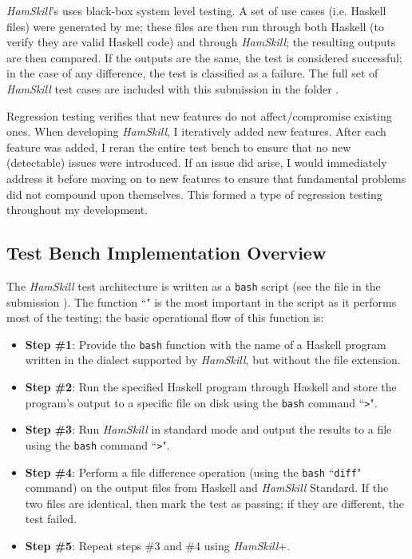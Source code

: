 \documentclass{report}
\begin{document}
\textit{HamSkill}'s uses black-box system level testing.  A set of use cases (i.e. Haskell files) were generated by me; these files are then run through both Haskell (to verify they are valid Haskell code) and through \textit{HamSkill}; the resulting outputs are then compared.  If the outputs are the same, the test is considered successful; in the case of any difference, the test is classified as a failure.  The full set of \textit{HamSkill} test cases are included with this submission in the folder .

Regression testing verifies that new features do not affect/compromise existing ones.  When developing \textit{HamSkill}, I iteratively added new features.  After each feature was added, I reran the entire test bench to ensure that no new (detectable) issues were introduced.  If an issue did arise, I would immediately address it before moving on to new features to ensure that fundamental problems did not compound upon themselves. This formed a type of regression testing throughout my development.

\subsection{Test Bench Implementation Overview}

The \textit{HamSkill} test architecture is written as a \texttt{bash} script (see the file in the submission ).  The function ``" is the most important in the script as it performs most of the testing; the basic operational flow of this function is:

\begin{itemize}

\item \textbf{Step \#1}: Provide the \texttt{bash} function with the name of a Haskell program written in the dialect supported by \textit{HamSkill}, but without the file extension.

\item \textbf{Step \#2}: Run the specified Haskell program through Haskell and store the program's output to a specific file on disk using the \texttt{bash} command ``\texttt{>}". 

\item\label{item:runHamSkillStandard} \textbf{Step \#3}: Run \textit{HamSkill} in standard mode and output the results to a file using the \texttt{bash} command ``\texttt{>}". 

\item\label{item:diffHamSkillStandard} \textbf{Step \#4}: Perform a file difference operation (using the \texttt{bash} ``\texttt{diff}" command) on the output files from Haskell and \textit{HamSkill} Standard.  If the two files are identical, then mark the test as passing; if they are different, the test failed.
 
\item \textbf{Step \#5}: Repeat steps \#3 and \#4 using \textit{HamSkill}+.

\end{itemize}
\end{document}
